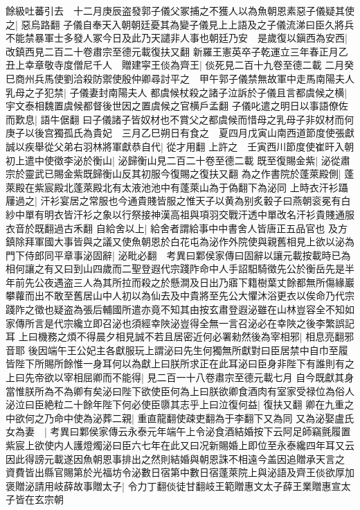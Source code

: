 餘級吐蕃引去　十二月庚辰盗發郭子儀父冢捕之不獲人以為魚朝恩素惡子儀疑其使之|{
	惡烏路翻}
子儀自奉天入朝朝廷憂其為變子儀見上上語及之子儀流涕曰臣久將兵不能禁暴軍士多發人冢今日及此乃天譴非人事也朝廷乃安　是歲復以鎭西為安西|{
	改鎮西見二百二十卷肅宗至德元載復扶又翻}
新羅王憲英卒子乾運立三年春正月乙丑上幸章敬寺度僧尼千人　贈建寜王倓為齊王|{
	倓死見二百十九卷至德二載}
二月癸巳商州兵馬使劉洽殺防禦使殷仲卿尋討平之　甲午郭子儀禁無故軍中走馬南陽夫人乳母之子犯禁|{
	子儀妻封南陽夫人}
都虞候杖殺之諸子泣訴於子儀且言都虞候之横|{
	宇文泰相魏置虞候都督後世因之置虞候之官横戶孟翻}
子儀叱遣之明日以事語僚佐而歎息|{
	語牛倨翻}
曰子儀諸子皆奴材也不賞父之都虞候而惜母之乳母子非奴材而何　庚子以後宫獨孤氏為貴妃　三月乙巳朔日有食之　夏四月戊寅山南西道節度使張獻誠以疾舉從父弟右羽林將軍獻恭自代|{
	從才用翻}
上許之　壬寅西川節度使崔旰入朝　初上遣中使徵李泌於衡山|{
	泌歸衡山見二百二十卷至德二載}
既至復賜金紫|{
	泌從肅宗於靈武已賜金紫既歸衡山反其初服今復賜之復扶又翻}
為之作書院於蓬萊殿側|{
	蓬萊殿在紫宸殿北蓬萊殿北有太液池池中有蓬萊山為于偽翻下為泌同}
上時衣汗衫躡屨過之|{
	汗衫宴居之常服也今通貴賤皆服之惟天子以黄為别炙轂子曰燕朝衮冕有白紗中單有明衣皆汗衫之象以行祭接神漢高祖與項羽交戰汗透中單改名汗衫貴賤通服衣音於既翻過古禾翻}
自給舍以上|{
	給舍者謂給事中中書舍人皆唐正五品官也}
及方鎮除拜軍國大事皆與之議又使魚朝恩於白花屯為泌作外院使與親舊相見上欲以泌為門下侍郎同平章事泌固辭|{
	泌毗必翻　考異曰鄴侯家傳曰固辭以讓元載按載時已為相何讓之有又曰到山四歲而二聖登遐代宗踐阼命中人手詔馹騎徵先公於衡岳先是半年前先公夜遇盗三人為其所拉而殺之於懸澗及日出乃寤下籍樹葉丈餘都無所傷緣巖攀蘿而出不敢至舊居山中人初以為仙去及中貴將至先公大懼沐浴更衣以俟命乃代宗踐阼之徵也疑盗為張后輔國所遣亦竟不知其由按玄肅登遐泌雖在山林豈容全不知如家傳所言是代宗纔立即召泌也須經幸陜泌豈得全無一言召泌必在幸陜之後李繁誤記耳}
上曰機務之煩不得晨夕相見誠不若且居密近何必署勑然後為宰相邪|{
	相息亮翻邪音耶}
後因端午王公妃主各獻服玩上謂泌曰先生何獨無所獻對曰臣居禁中自巾至履皆陛下所賜所餘惟一身耳何以為獻上曰朕所求正在此耳泌曰臣身非陛下有誰則有之上曰先帝欲以宰相屈卿而不能得|{
	見二百一十八卷肅宗至德元載七月}
自今既獻其身當惟朕所為不為卿有矣泌曰陛下欲使臣何為上曰朕欲卿食酒肉有室家受禄位為俗人泌泣曰臣絶粒二十餘年陛下何必使臣隳其志乎上曰泣復何益|{
	復扶又翻}
卿在九重之中欲何之乃命中使為泌葬二親|{
	重直龍翻使疎吏翻為于李翻下又為同}
又為泌娶盧氏女為妻　|{
	考異曰鄴侯家傳云永泰元年端午上令泌食酒結婚按下云阿足師竊氈履置紫宸上欲使内人護燈燭泌曰臣六七年在此又曰况新賜婚上即位至永泰纔四年耳又云因此得謗元載遂因魚朝恩事排出之然則結婚與朝恩誅不相遠今盖因追贈承天言之}
資費皆出縣官賜第於光福坊令泌數日宿第中數日宿蓬萊院上與泌語及齊王倓欲厚加褒贈泌請用岐薛故事贈太子|{
	令力丁翻倓徒甘翻岐王範贈惠文太子薛王業贈惠宣太子皆在玄宗朝}
